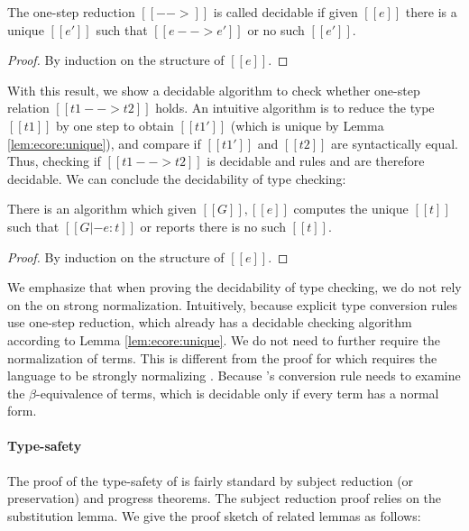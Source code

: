 \begin{lem}\label{lem:ecore:unique}
	The one-step reduction $[[-->]]$ is called decidable if 
given $[[e]]$ there is a unique $[[e']]$ such that $[[e --> e']]$ or no such $[[e']]$.
\end{lem}

\begin{proof}
	By induction on the structure of $[[e]]$.
\end{proof}

With this result, we show a decidable algorithm to check whether one-step
relation $[[t1 --> t2]]$ holds. An intuitive algorithm is to reduce the type
$[[t1]]$ by one step to obtain $[[t1']]$ (which is unique by Lemma
\ref{lem:ecore:unique}), and compare if $[[t1']]$ and $[[t2]]$ are
syntactically equal. Thus, checking if $[[t1 --> t2]]$ is decidable and rules
 and  are therefore decidable. We can
conclude the decidability of type checking:

\begin{thm}\label{lem:ecore:decide}
	There is an algorithm which given $[[G]], [[e]]$ computes the unique
$[[t]]$ such that $[[G |- e:t]]$ or reports there is no such $[[t]]$.
\end{thm}

\begin{proof}
	By induction on the structure of $[[e]]$.
\end{proof}

We emphasize that when proving the decidability of type checking, we do not rely on the
on strong normalization. Intuitively, because explicit type conversion rules use one-step
reduction, which already has a decidable checking algorithm according to Lemma
\ref{lem:ecore:unique}. We do not need to further require the normalization of
terms. This is different from the proof for \cc which requires the
language to be strongly
normalizing \cite{pts:normalize}. Because \cc's conversion rule needs to
examine the $\beta$-equivalence of terms, which is decidable only if every term
has a normal form.

\paragraph{Type-safety}
The proof of the type-safety of \ecore is fairly standard by subject
reduction (or preservation) and progress theorems. The subject reduction proof
relies on the substitution lemma. We give the proof sketch of related lemmas as
follows:

